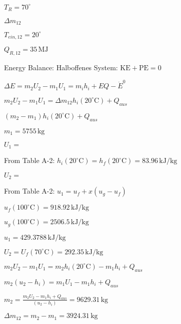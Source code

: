 \( T_R = 70^\circ \)  

\( \Delta m_{12} \)  

\( T_{ein,12} = 20^\circ \)  

\( Q_{R,12} = 35 \, \text{MJ} \)  

Energy Balance: Halboffenes System: \( \text{KE} + \text{PE} = 0 \)  

\( \Delta E = m_2 U_2 - m_1 U_1 = m_i h_i + EQ - \dot{E}^0 \)  

\( m_2 U_2 - m_1 U_1 = \Delta m_{12} h_i(20^\circ \text{C}) + Q_{aus} \)  

\( (m_2 - m_1) h_i(20^\circ \text{C}) + Q_{aus} \)  

\( m_1 = 5755 \, \text{kg} \)  

\( U_1 = \)  

From Table A-2:  
\( h_i(20^\circ \text{C}) = h_f(20^\circ \text{C}) = 83.96 \, \text{kJ/kg} \)  

\( U_2 = \)  

From Table A-2:  
\( u_1 = u_f + x(u_g - u_f) \)  

\( u_f(100^\circ \text{C}) = 918.92 \, \text{kJ/kg} \)  

\( u_g(100^\circ \text{C}) = 2506.5 \, \text{kJ/kg} \)  

\( u_1 = 429.3788 \, \text{kJ/kg} \)  

\( U_2 = U_f(70^\circ \text{C}) = 292.35 \, \text{kJ/kg} \)  

\( m_2 U_2 - m_1 U_1 = m_2 h_i(20^\circ \text{C}) - m_1 h_i + Q_{aus} \)  

\( m_2 (u_2 - h_i) = m_1 U_1 - m_1 h_i + Q_{aus} \)  

\( m_2 = \frac{m_2 U_2 - m_1 h_i + Q_{aus}}{(u_2 - h_i)} = 9629.31 \, \text{kg} \)  

\( \Delta m_{12} = m_2 - m_1 = 3924.31 \, \text{kg} \)